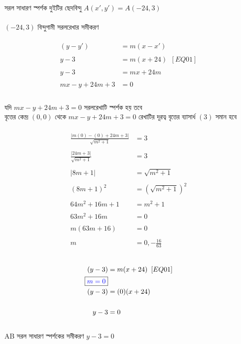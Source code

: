\documentclass{article}
\begin{document}
\\
সরল সাধারণ স্পর্শক দুইটির ছেদবিন্দু $A(x',y')=A(-24,3)$\\
\\
$(-24,3)$ বিন্দুগামী সরলরেখার  সমীকরণ \\
\\ 
\begin{align*}
	(y-y')&=m(x-x')\\
	\\
	y-3&=m(x+24)\,\,\,[EQ01]\\
	\\
	y-3&=mx+24m\\
	\\
	mx-y+24m+3&=0\\
\end{align*}
\\
যদি $mx-y+24m+3=0$ সরলরেখাটি স্পর্শক হয় তবে \\
বৃত্তের কেন্দ্র $(0,0)$ থেকে $mx-y+24m+3=0$ রেখাটির  দূরত্ব  বৃত্তের ব্যাসার্ধ $(3)$ সমান হবে \\
\\  
\begin{align*}
	\frac{|m(0)-(0)+24m+3|}{\sqrt{m^2+1}}&=3\\
	\\
	\frac{|24m+3|}{\sqrt{m^2+1}}&=3\\
	\\
	|8m+1|&=\sqrt{m^2+1}\\
	\\
	(8m+1)^2&=(\sqrt{m^2+1})^2\\
	\\
	64m^2+16m+1&=m^2+1\\
	\\
	63m^2+16m&=0\\
	\\
	m(63m+16)&=0\\
	\\
	m&=0,-\frac{16}{63}\\
\end{align*}
\\
\begin{align*}
	(y-3)&=m(x+24)\,\,\,[EQ01]\\
	\boxed{\textcolor{blue}{m=0}}&\\
	(y-3)&=(0)(x+24)\\
	\\
	y-3&=0\\
\end{align*}
\\ 
AB সরল সাধারণ স্পর্শকের সমীকরণ $y-3=0$\\
\end{document}
